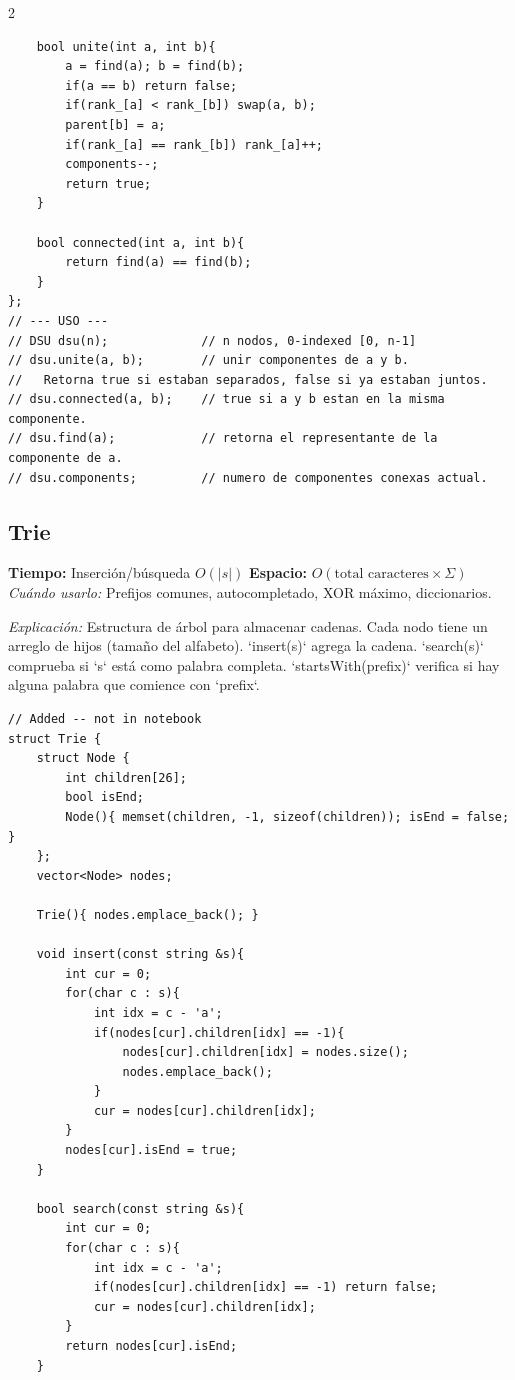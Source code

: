 \documentclass[10pt,a4paper]{article}
\begin{document}
\begin{multicols}{2}
\begin{lstlisting}
    bool unite(int a, int b){
        a = find(a); b = find(b);
        if(a == b) return false;
        if(rank_[a] < rank_[b]) swap(a, b);
        parent[b] = a;
        if(rank_[a] == rank_[b]) rank_[a]++;
        components--;
        return true;
    }

    bool connected(int a, int b){
        return find(a) == find(b);
    }
};
// --- USO ---
// DSU dsu(n);             // n nodos, 0-indexed [0, n-1]
// dsu.unite(a, b);        // unir componentes de a y b.
//   Retorna true si estaban separados, false si ya estaban juntos.
// dsu.connected(a, b);    // true si a y b estan en la misma componente.
// dsu.find(a);            // retorna el representante de la componente de a.
// dsu.components;         // numero de componentes conexas actual.
\end{lstlisting}

\subsection{Trie}
\textbf{Tiempo:} Inserci\'on/b\'usqueda $O(|s|)$ \quad \textbf{Espacio:} $O(\text{total caracteres} \times \Sigma)$\\
\textit{Cu\'ando usarlo:} Prefijos comunes, autocompletado, XOR m\'aximo, diccionarios.

\textit{Explicación:} Estructura de árbol para almacenar cadenas. Cada nodo tiene un arreglo de hijos (tamaño del alfabeto). `insert(s)` agrega la cadena. `search(s)` comprueba si `s` está como palabra completa. `startsWith(prefix)` verifica si hay alguna palabra que comience con `prefix`.

\begin{lstlisting}
// Added -- not in notebook
struct Trie {
    struct Node {
        int children[26];
        bool isEnd;
        Node(){ memset(children, -1, sizeof(children)); isEnd = false; }
    };
    vector<Node> nodes;

    Trie(){ nodes.emplace_back(); }

    void insert(const string &s){
        int cur = 0;
        for(char c : s){
            int idx = c - 'a';
            if(nodes[cur].children[idx] == -1){
                nodes[cur].children[idx] = nodes.size();
                nodes.emplace_back();
            }
            cur = nodes[cur].children[idx];
        }
        nodes[cur].isEnd = true;
    }

    bool search(const string &s){
        int cur = 0;
        for(char c : s){
            int idx = c - 'a';
            if(nodes[cur].children[idx] == -1) return false;
            cur = nodes[cur].children[idx];
        }
        return nodes[cur].isEnd;
    }


\end{lstlisting}
\end{multicols}
\end{document}
